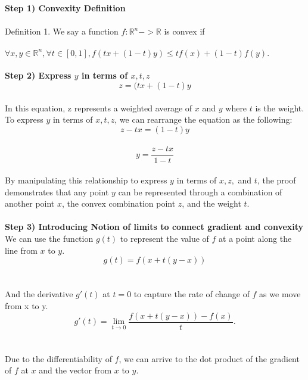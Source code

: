\documentclass{assignment}
\newcommand{\R}{\mathbb{R}}
\begin{document}
\begin{problem}
\begin{enumerate}
\begin{enumerate}
    \textbf{Step 1) Convexity Definition}\\\\
    Definition 1. We say a function $f : \R^n -> \R$ is convex if\\\\
    $\forall x,y \in \R^n, \forall t \in [0,1], f(tx + (1-t)y) \leq tf(x) + (1-t)f(y).$\\\\

    \textbf{Step 2) Express $y$ in terms of $x, t, z$}\\
    
    $$z = (tx + (1-t)y$$\\

    In this equation, z represents a weighted average of $x$ and $y$ where $t$ is the weight. To express $y$ in terms of $x, t, z$, we can rearrange the equation as the following:\\
    
    $$z - tx = (1-t)y$$\\
    $$y = \frac{z - tx}{1-t}$$\\

    By manipulating this relationship to express $y$ in terms of $x, z,$ and $t$, the proof demonstrates that any point $y$ can be represented through a combination of another point $x$, the convex combination point $z$, and the weight $t$.\\\\

    \textbf{Step 3) Introducing Notion of limits to connect gradient and convexity}\\

    We can use the function $g(t)$ to represent the value of $f$ at a point along the line from $x$ to $y$.\\
    
    $$g(t) = f(x+t(y-x))$$\\\\
    
    And the derivative $g'(t)$ at $t=0$ to capture the rate of change of $f$ as we move from x to y.\\

    $$g'(t) = \lim_{t\to 0} \frac{f(x+t(y-x)) - f(x)}{t}.$$\\\\
    
    Due to the differentiability of $f$, we can arrive to the dot product of the gradient of $f$ at $x$ and the vector from $x$ to $y$.\\
    

\end{enumerate}
\end{enumerate}
\end{problem}
\end{document}
